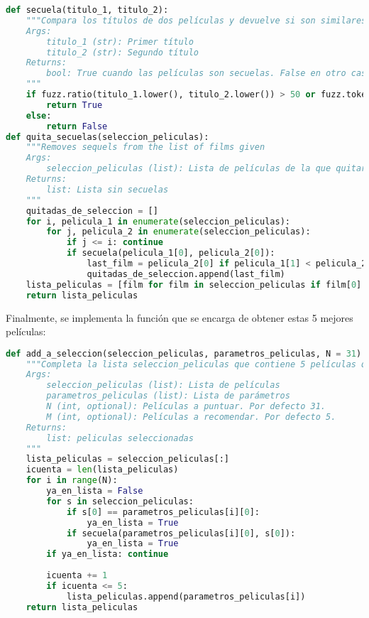 \begin{lstlisting}[language=Python, label={lst:sequel},caption={Determinación de si dos películas son o no secuelas y eliminarlas. Se determina que dos películas son secuelas si tienen el mismo título o es muy similar.}]
def secuela(titulo_1, titulo_2):   
    """Compara los títulos de dos películas y devuelve si son similares o no
    Args:
        titulo_1 (str): Primer título
        titulo_2 (str): Segundo título
    Returns:
        bool: True cuando las películas son secuelas. False en otro caso
    """
    if fuzz.ratio(titulo_1.lower(), titulo_2.lower()) > 50 or fuzz.token_set_ratio(titulo_1.lower(), titulo_2.lower()) > 60:
        return True
    else:
        return False
def quita_secuelas(seleccion_peliculas):
    """Removes sequels from the list of films given
    Args:
        seleccion_peliculas (list): Lista de películas de la que quitar las secuelas
    Returns:
        list: Lista sin secuelas
    """ 
    quitadas_de_seleccion = []
    for i, pelicula_1 in enumerate(seleccion_peliculas):
        for j, pelicula_2 in enumerate(seleccion_peliculas):
            if j <= i: continue 
            if secuela(pelicula_1[0], pelicula_2[0]): 
                last_film = pelicula_2[0] if pelicula_1[1] < pelicula_2[1] else pelicula_1[0]
                quitadas_de_seleccion.append(last_film)
    lista_peliculas = [film for film in seleccion_peliculas if film[0] not in quitadas_de_seleccion]
    return lista_peliculas
\end{lstlisting}

Finalmente, se implementa la función que se encarga de obtener estas 5 mejores películas:

\begin{lstlisting}[language=Python, caption={Función que se encarga de completar la selección de las 5 películas que se recomendarán.}]
def add_a_seleccion(seleccion_peliculas, parametros_peliculas, N = 31):
    """Completa la lista seleccion_peliculas que contiene 5 películas que se recomendarán al usuario. Las películas son seleccionadas de parametros_películas y sólo se tienen en cuenta si el título es suficientemente distinto del de otras películas.
    Args:
        seleccion_peliculas (list): Lista de películas
        parametros_peliculas (list): Lista de parámetros
        N (int, optional): Películas a puntuar. Por defecto 31.
        M (int, optional): Películas a recomendar. Por defecto 5.
    Returns:
        list: peliculas seleccionadas
    """
    lista_peliculas = seleccion_peliculas[:]
    icuenta = len(lista_peliculas)    
    for i in range(N):
        ya_en_lista = False
        for s in seleccion_peliculas:
            if s[0] == parametros_peliculas[i][0]: 
                ya_en_lista = True
            if secuela(parametros_peliculas[i][0], s[0]): 
                ya_en_lista = True            
        if ya_en_lista: continue
            
        icuenta += 1
        if icuenta <= 5:
            lista_peliculas.append(parametros_peliculas[i])
    return lista_peliculas
\end{lstlisting}


